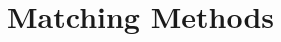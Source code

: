 \documentclass[12pt,journal]{IEEEtran}
\begin{document}
%
%
\section{Matching Methods}
\end{document}
